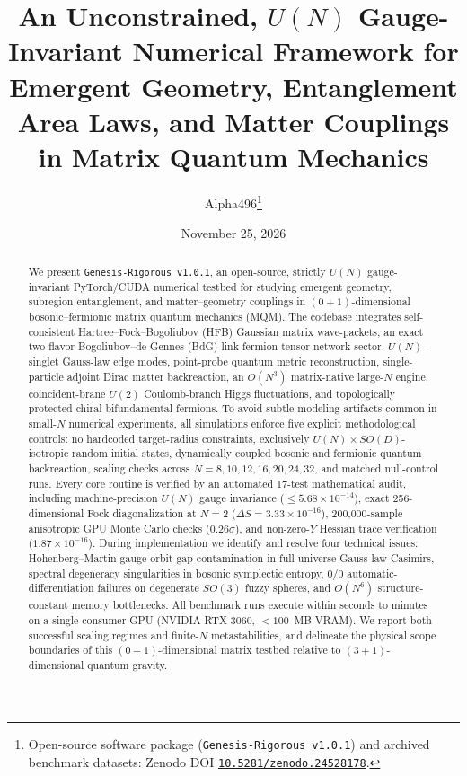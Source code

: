 \documentclass[11pt,a4paper]{article}
\title{\textbf{An Unconstrained, $U(N)$ Gauge-Invariant Numerical Framework for Emergent Geometry, Entanglement Area Laws, and Matter Couplings in Matrix Quantum Mechanics}}
\author{Alpha496\thanks{Open-source software package (\texttt{Genesis-Rigorous v1.0.1}) and archived benchmark datasets: Zenodo DOI \href{https://doi.org/10.5281/zenodo.24528178}{\texttt{10.5281/zenodo.24528178}}.}}
\date{November 25, 2026}
\begin{document}
\maketitle

\begin{abstract}
We present \texttt{Genesis-Rigorous v1.0.1}, an open-source, strictly $U(N)$ gauge-invariant PyTorch/CUDA numerical testbed for studying emergent geometry, subregion entanglement, and matter--geometry couplings in $(0+1)$-dimensional bosonic--fermionic matrix quantum mechanics (MQM). The codebase integrates self-consistent Hartree--Fock--Bogoliubov (HFB) Gaussian matrix wave-packets, an exact two-flavor Bogoliubov--de Gennes (BdG) link-fermion tensor-network sector, $U(N)$-singlet Gauss-law edge modes, point-probe quantum metric reconstruction, single-particle adjoint Dirac matter backreaction, an $O(N^3)$ matrix-native large-$N$ engine, coincident-brane $U(2)$ Coulomb-branch Higgs fluctuations, and topologically protected chiral bifundamental fermions. To avoid subtle modeling artifacts common in small-$N$ numerical experiments, all simulations enforce five explicit methodological controls: no hardcoded target-radius constraints, exclusively $U(N)\times SO(D)$-isotropic random initial states, dynamically coupled bosonic and fermionic quantum backreaction, scaling checks across $N = 8, 10, 12, 16, 20, 24, 32$, and matched null-control runs. Every core routine is verified by an automated 17-test mathematical audit, including machine-precision $U(N)$ gauge invariance ($\le 5.68\times 10^{-14}$), exact 256-dimensional Fock diagonalization at $N=2$ ($\Delta S = 3.33\times 10^{-16}$), 200{,}000-sample anisotropic GPU Monte Carlo checks ($0.26\sigma$), and non-zero-$Y$ Hessian trace verification ($1.87\times 10^{-16}$). During implementation we identify and resolve four technical issues: Hohenberg--Martin gauge-orbit gap contamination in full-universe Gauss-law Casimirs, spectral degeneracy singularities in bosonic symplectic entropy, $0/0$ automatic-differentiation failures on degenerate $SO(3)$ fuzzy spheres, and $O(N^6)$ structure-constant memory bottlenecks. All benchmark runs execute within seconds to minutes on a single consumer GPU (NVIDIA RTX 3060, $<100$~MB VRAM). We report both successful scaling regimes and finite-$N$ metastabilities, and delineate the physical scope boundaries of this $(0+1)$-dimensional matrix testbed relative to $(3+1)$-dimensional quantum gravity.
\end{abstract}

\tableofcontents
\newpage
\end{document}

